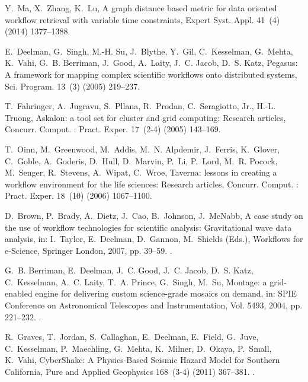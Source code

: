 \documentclass[final,5p,times,twocolumn]{elsarticle}
\begin{document}
\begin{thebibliography}{10}
Y.~Ma, X.~Zhang, K.~Lu, A graph distance based metric for data oriented
  workflow retrieval with variable time constraints, Expert Syst. Appl. 41~(4)
  (2014) 1377--1388.

E.~Deelman, G.~Singh, M.-H. Su, J.~Blythe, Y.~Gil, C.~Kesselman, G.~Mehta,
  K.~Vahi, G.~B. Berriman, J.~Good, A.~Laity, J.~C. Jacob, D.~S. Katz, Pegasus:
  A framework for mapping complex scientific workflows onto distributed
  systems, Sci. Program. 13~(3) (2005) 219--237.

T.~Fahringer, A.~Jugravu, S.~Pllana, R.~Prodan, C.~Seragiotto, Jr., H.-L.
  Truong, Askalon: a tool set for cluster and grid computing: Research
  articles, Concurr. Comput. : Pract. Exper. 17~(2-4) (2005) 143--169.

T.~Oinn, M.~Greenwood, M.~Addis, M.~N. Alpdemir, J.~Ferris, K.~Glover,
  C.~Goble, A.~Goderis, D.~Hull, D.~Marvin, P.~Li, P.~Lord, M.~R. Pocock,
  M.~Senger, R.~Stevens, A.~Wipat, C.~Wroe, Taverna: lessons in creating a
  workflow environment for the life sciences: Research articles, Concurr.
  Comput. : Pract. Exper. 18~(10) (2006) 1067--1100.

D.~Brown, P.~Brady, A.~Dietz, J.~Cao, B.~Johnson, J.~McNabb, A case study on
  the use of workflow technologies for scientific analysis: Gravitational wave
  data analysis, in: I.~Taylor, E.~Deelman, D.~Gannon, M.~Shields (Eds.),
  Workflows for e-Science, Springer London, 2007, pp. 39--59.
\newblock \href {http://dx.doi.org/10.1007/978-1-84628-757-2\_4}
  {}.

G.~B. Berriman, E.~Deelman, J.~C. Good, J.~C. Jacob, D.~S. Katz, C.~Kesselman,
  A.~C. Laity, T.~A. Prince, G.~Singh, M.~Su, Montage: a grid-enabled engine
  for delivering custom science-grade mosaics on demand, in: {SPIE Conference
  on Astronomical Telescopes and Instrumentation}, Vol. 5493, 2004, pp.
  221--232.
\newblock \href {http://dx.doi.org/10.1117/12.550551}
  {}.

R.~Graves, T.~Jordan, S.~Callaghan, E.~Deelman, E.~Field, G.~Juve,
  C.~Kesselman, P.~Maechling, G.~Mehta, K.~Milner, D.~Okaya, P.~Small, K.~Vahi,
  {CyberShake: A Physics-Based Seismic Hazard Model for Southern California},
  Pure and Applied Geophysics 168~(3-4) (2011) 367--381.
\newblock \href {http://dx.doi.org/10.1007/s00024-010-0161-6}
  {}.


\end{thebibliography}
\end{document}

